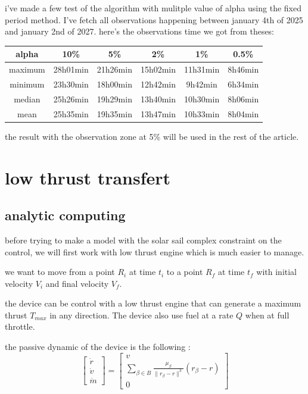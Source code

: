 \documentclass[11pt]{article} %
\begin{document}
		i've made a few test of the algorithm with mulitple value of alpha using the fixed period method. I've fetch all observations happening between january 4th of 2025 and january 2nd of 2027. here's the observations time we got from theses:  
		\begin{center}
			\begin{tabular}{||c||c c c c c||} 
				\hline
				alpha & 10\% & 5\% & 2\% &1\% & 0.5\% \\ [0.5ex] 
				\hline\hline
				maximum & 28h01min & 21h26min & 15h02min &11h31min & 8h46min \\ 
				\hline
				minimum & 23h30min & 18h00min & 12h42min &9h42min& 6h34min \\
				\hline
				median & 25h26min & 19h29min & 13h40min &10h30min& 8h06min\\
				\hline
				mean & 25h35min & 19h35min & 13h47min &10h33min& 8h04min\\ 
				\hline
			\end{tabular}
		\end{center}
		
		the result with the observation zone at 5\% will be used in the rest of the article.
		
		\section{low thrust transfert}
			
			\subsection{analytic computing}
			
			before trying to make a model with the solar sail complex constraint on the control, we will first work with low thrust engine which is much easier to manage.
			
			we want to move from a point $R_i$ at time $t_i$ to a point $R_f$ at time $t_f$ with initial velocity $V_i$ and final velocity $V_f$.
			
			the device can be control with a low thrust engine that can generate a maximum thrust $T_{max}$ in any direction. The device also use fuel at a rate $Q$ when at full throttle.
			
			the passive dynamic of the device is the following : 
			$$
			\begin{bmatrix}
				\dot{r}\\
				\dot{v}\\
				\dot{m}
			\end{bmatrix} =\begin{bmatrix}
				v\\
				\sum\limits _{\beta \in B }\frac{\mu _{\beta }}{\| r_{\beta } -r\| ^{3}}( r_{\beta } -r)\\
				0
			\end{bmatrix}
			$$
			
\end{document}
